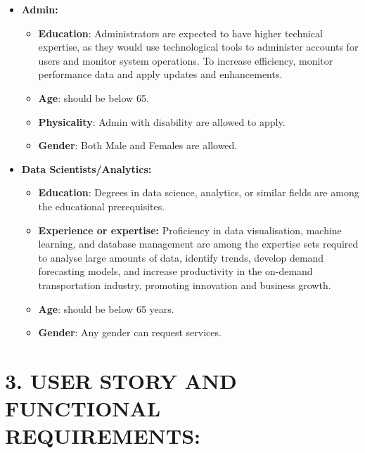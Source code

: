 \documentclass[9pt]{report}
\begin{document}
\begin{itemize}
\item \textbf{Admin:}
    \begin{itemize}
        \item \textbf{Education}: Administrators are expected to have higher technical expertise, as they would use technological tools to administer accounts for users and monitor system operations. To increase efficiency, monitor performance data and apply updates and enhancements.
        \item \textbf{Age}: should be below 65.
        \item \textbf{Physicality}: Admin with disability are allowed to apply.
        \item \textbf{Gender}: Both Male and Females are allowed.
    \end{itemize}

\item \textbf{Data Scientists/Analytics:}
    \begin{itemize}
        \item \textbf{Education}: Degrees in data science, analytics, or similar fields are among the educational prerequisites.
        \item \textbf{Experience or expertise:} Proficiency in data visualisation, machine learning, and database management are among the expertise sets required to analyse large amounts of data, identify trends, develop demand forecasting models, and increase productivity in the on-demand transportation industry, promoting innovation and business growth.
        \item \textbf{Age}: should be below 65 years.
        \item \textbf{Gender}: Any gender can request services.
    \end{itemize}
\end{itemize}

\section*{3. USER STORY AND FUNCTIONAL REQUIREMENTS:}
\end{document}
